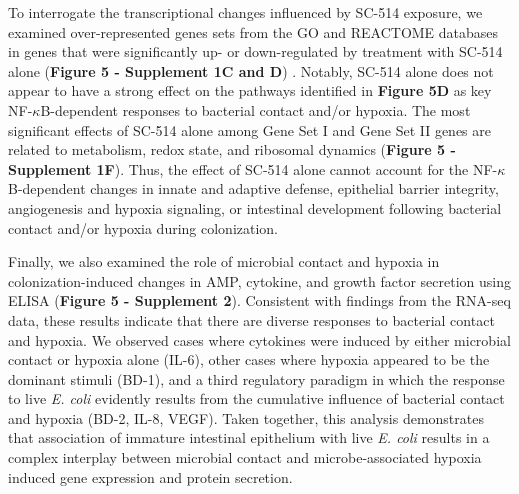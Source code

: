 \documentclass[9pt,lineo]{elife}
\begin{document}
To interrogate the transcriptional changes influenced by SC-514 exposure, we examined over-represented genes sets from the GO and REACTOME databases in genes that were significantly up- or down-regulated by treatment with SC-514 alone (\textbf{Figure 5 - Supplement 1C and D}) . Notably, SC-514 alone does not appear to have a strong effect on the pathways identified in \textbf{Figure 5D} as key NF-\(\kappa\)B-dependent responses to bacterial contact and/or hypoxia. The most significant effects of SC-514 alone among Gene Set I and Gene Set II genes are related to metabolism, redox state, and ribosomal dynamics (\textbf{Figure 5 - Supplement 1F}). Thus, the effect of SC-514 alone cannot account for the NF-\(\kappa\)B-dependent changes in innate and adaptive defense, epithelial barrier integrity, angiogenesis and hypoxia signaling, or intestinal development following bacterial contact and/or hypoxia during colonization.

Finally, we also examined the role of microbial contact and hypoxia in colonization-induced changes in AMP, cytokine, and growth factor secretion using ELISA (\textbf{Figure 5 - Supplement 2}). Consistent with findings from the RNA-seq data, these results indicate that there are diverse responses to bacterial contact and hypoxia. We observed cases where cytokines were induced by either microbial contact or hypoxia alone (IL-6), other cases where hypoxia appeared to be the dominant stimuli (BD-1), and a third regulatory paradigm in which the response to live \emph{E. coli} evidently results from the cumulative influence of bacterial contact and hypoxia (BD-2, IL-8, VEGF). Taken together, this analysis demonstrates that association of immature intestinal epithelium with live \emph{E. coli} results in a complex interplay between microbial contact and microbe-associated hypoxia induced gene expression and protein secretion. 
\end{document}
